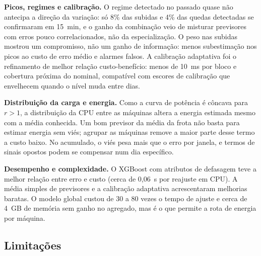 \documentclass[a4paper,12pt]{article}
\begin{document}
\textbf{Picos, regimes e calibração.} O regime detectado no passado quase não antecipa a direção da variação: só 8\% das subidas e 4\% das quedas detectadas se confirmaram em 15~min, e o ganho da combinação veio de misturar previsores com erros pouco correlacionados, não da especialização. O peso nas subidas mostrou um compromisso, não um ganho de informação: menos subestimação nos picos ao custo de erro médio e alarmes falsos. A calibração adaptativa foi o refinamento de melhor relação custo-benefício: menos de 10~ms por bloco e cobertura próxima do nominal, compatível com escores de calibração que envelhecem quando o nível muda entre dias.

\textbf{Distribuição da carga e energia.} Como a curva de potência é côncava para $r > 1$, a distribuição da CPU entre as máquinas altera a energia estimada mesmo com a média conhecida. Um bom previsor da média da frota não basta para estimar energia sem viés; agrupar as máquinas remove a maior parte desse termo a custo baixo. No acumulado, o viés pesa mais que o erro por janela, e termos de sinais opostos podem se compensar num dia específico.

\textbf{Desempenho e complexidade.} O XGBoost com atributos de defasagem teve a melhor relação entre erro e custo (cerca de 0,06~s por reajuste em CPU). A média simples de previsores e a calibração adaptativa acrescentaram melhorias baratas. O modelo global custou de 30 a 80 vezes o tempo de ajuste e cerca de 4~GB de memória sem ganho no agregado, mas é o que permite a rota de energia por máquina.

\subsection{Limitações}
\label{sec:limitacoes}
\end{document}
